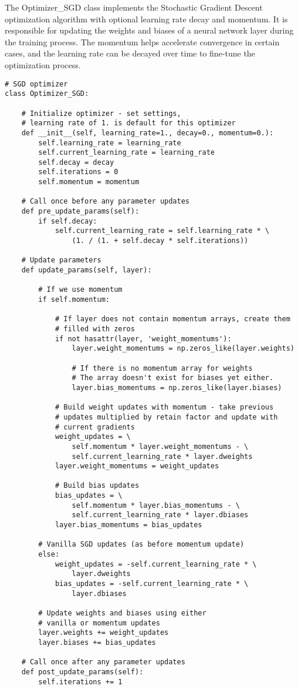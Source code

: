 \documentclass{article}
\begin{document}
The Optimizer\_SGD class implements the Stochastic Gradient Descent optimization algorithm with optional learning rate decay and momentum. It is responsible for updating the weights and biases of a neural network layer during the training process. The momentum helps accelerate convergence in certain cases, and the learning rate can be decayed over time to fine-tune the optimization process.
\begin{lstlisting}
# SGD optimizer
class Optimizer_SGD:

    # Initialize optimizer - set settings,
    # learning rate of 1. is default for this optimizer
    def __init__(self, learning_rate=1., decay=0., momentum=0.):
        self.learning_rate = learning_rate
        self.current_learning_rate = learning_rate
        self.decay = decay
        self.iterations = 0
        self.momentum = momentum

    # Call once before any parameter updates
    def pre_update_params(self):
        if self.decay:
            self.current_learning_rate = self.learning_rate * \
                (1. / (1. + self.decay * self.iterations))

    # Update parameters
    def update_params(self, layer):

        # If we use momentum
        if self.momentum:

            # If layer does not contain momentum arrays, create them
            # filled with zeros
            if not hasattr(layer, 'weight_momentums'):
                layer.weight_momentums = np.zeros_like(layer.weights)

                # If there is no momentum array for weights
                # The array doesn't exist for biases yet either.
                layer.bias_momentums = np.zeros_like(layer.biases)

            # Build weight updates with momentum - take previous
            # updates multiplied by retain factor and update with
            # current gradients
            weight_updates = \
                self.momentum * layer.weight_momentums - \
                self.current_learning_rate * layer.dweights
            layer.weight_momentums = weight_updates

            # Build bias updates
            bias_updates = \
                self.momentum * layer.bias_momentums - \
                self.current_learning_rate * layer.dbiases
            layer.bias_momentums = bias_updates

        # Vanilla SGD updates (as before momentum update)
        else:
            weight_updates = -self.current_learning_rate * \
                layer.dweights
            bias_updates = -self.current_learning_rate * \
                layer.dbiases

        # Update weights and biases using either
        # vanilla or momentum updates
        layer.weights += weight_updates
        layer.biases += bias_updates

    # Call once after any parameter updates
    def post_update_params(self):
        self.iterations += 1
\end{lstlisting}
\end{document}
